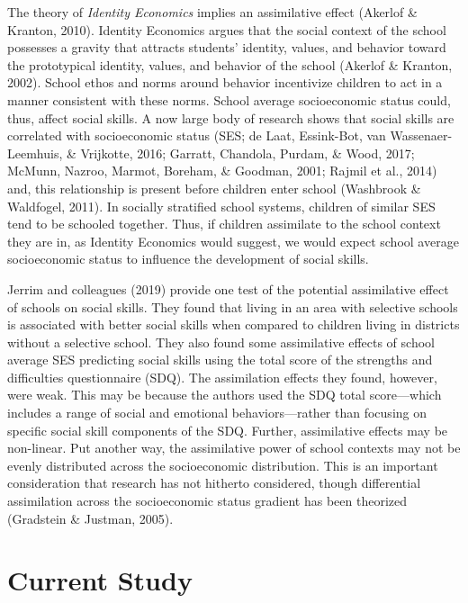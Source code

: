 \documentclass[
  english,
  man]{apa6}
\begin{document}
The theory of \emph{Identity Economics} implies an assimilative effect (Akerlof \& Kranton, 2010). Identity Economics argues that the social context of the school possesses a gravity that attracts students' identity, values, and behavior toward the prototypical identity, values, and behavior of the school (Akerlof \& Kranton, 2002). School ethos and norms around behavior incentivize children to act in a manner consistent with these norms. School average socioeconomic status could, thus, affect social skills. A now large body of research shows that social skills are correlated with socioeconomic status (SES; de Laat, Essink-Bot, van Wassenaer-Leemhuis, \& Vrijkotte, 2016; Garratt, Chandola, Purdam, \& Wood, 2017; McMunn, Nazroo, Marmot, Boreham, \& Goodman, 2001; Rajmil et al., 2014) and, this relationship is present before children enter school (Washbrook \& Waldfogel, 2011). In socially stratified school systems, children of similar SES tend to be schooled together. Thus, if children assimilate to the school context they are in, as Identity Economics would suggest, we would expect school average socioeconomic status to influence the development of social skills.

Jerrim and colleagues (2019) provide one test of the potential assimilative effect of schools on social skills. They found that living in an area with selective schools is associated with better social skills when compared to children living in districts without a selective school. They also found some assimilative effects of school average SES predicting social skills using the total score of the strengths and difficulties questionnaire (SDQ). The assimilation effects they found, however, were weak. This may be because the authors used the SDQ total score---which includes a range of social and emotional behaviors---rather than focusing on specific social skill components of the SDQ. Further, assimilative effects may be non-linear. Put another way, the assimilative power of school contexts may not be evenly distributed across the socioeconomic distribution. This is an important consideration that research has not hitherto considered, though differential assimilation across the socioeconomic status gradient has been theorized (Gradstein \& Justman, 2005).

\hypertarget{current-study}{%
\section{Current Study}\label{current-study}}
\end{document}
